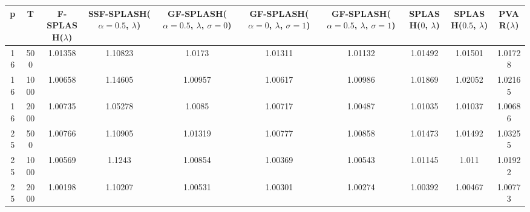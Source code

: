 \begin{tabular}{cccccccccc}
\hline
  p  &  T   &  F-SPLASH($\lambda$)  &  SSF-SPLASH($\alpha=0.5$, $\lambda$)  &  GF-SPLASH($\alpha=0.5$, $\lambda$, $\sigma=0$)  &  GF-SPLASH($\alpha=0$, $\lambda$, $\sigma=1$)  &  GF-SPLASH($\alpha=0.5$, $\lambda$, $\sigma=1$)  &  SPLASH($0$, $\lambda$)  &  SPLASH($0.5$, $\lambda$)  &  PVAR($\lambda$)  \\
\hline
 16  & 500  &        1.01358        &                1.10823                &                      1.0173                      &                    1.01311                     &                     1.01132                      &         1.01492          &          1.01501           &      1.01728      \\
 16  & 1000 &        1.00658        &                1.14605                &                     1.00957                      &                    1.00617                     &                     1.00986                      &         1.01869          &          1.02052           &      1.02165      \\
 16  & 2000 &        1.00735        &                1.05278                &                      1.0085                      &                    1.00717                     &                     1.00487                      &         1.01035          &          1.01037           &      1.00686      \\
 25  & 500  &        1.00766        &                1.10905                &                     1.01319                      &                    1.00777                     &                     1.00858                      &         1.01473          &          1.01492           &      1.03255      \\
 25  & 1000 &        1.00569        &                1.1243                 &                     1.00854                      &                    1.00369                     &                     1.00543                      &         1.01145          &           1.011            &      1.01922      \\
 25  & 2000 &        1.00198        &                1.10207                &                     1.00531                      &                    1.00301                     &                     1.00274                      &         1.00392          &          1.00467           &      1.00773      \\
\hline
\end{tabular}